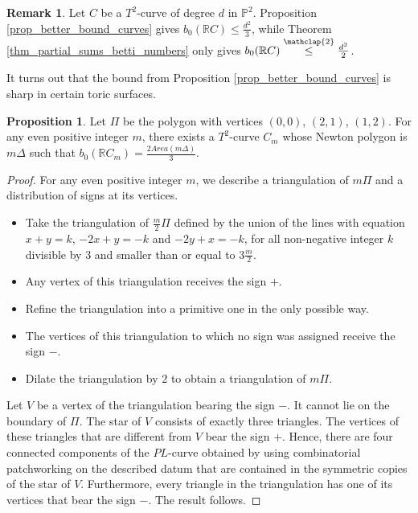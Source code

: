 \documentclass[12pt]{article}
\newcommand\customleqdeux{\stackrel{\mathclap{\normalfont\scriptsize\mbox{2}}}{\leq}}
\newcommand{\R}{\mathbb{R}}
\renewcommand{\P}{\mathbb{P}}
\theoremstyle{definition}
\newtheorem{prop}{Proposition}[section]
\newtheorem{rmk}{Remark}[section]
\begin{document}
\begin{rmk}
    Let $C$ be a $T^2$-curve of degree $d$ in $\P^2$. Proposition \ref{prop_better_bound_curves} gives $b_0(\R C) \leq \frac{d^2}{3}$, while Theorem \ref{thm_partial_sums_betti_numbers} only gives $b_0(\R C) \customleqdeux \frac{d^2}{2}$.
\end{rmk}

\begin{sloppypar}
    It turns out that the bound from Proposition \ref{prop_better_bound_curves} is sharp in certain toric surfaces.
\end{sloppypar}

\begin{prop}
    \label{prop_b0_curves}
    Let $\Pi$ be the polygon with vertices $(0,0)$, $(2,1)$, $(1,2)$.
    For any even positive integer $m$, there exists a $T^2$-curve $C_m$  whose Newton polygon is $m\Delta$ such that $b_0(\R C_m) = \frac{2Area(m\Delta)}{3}$.
\end{prop}

\begin{proof}
    For any even positive integer $m$, we describe a triangulation of $m\Pi$ and a distribution of signs at its vertices.
    \begin{itemize}
        \item Take the triangulation of $\frac{m}{2} \Pi$ defined by the union of the lines with equation $x+y = k$, $-2x+y = -k$ and $-2y+x = -k$, for all non-negative integer $k$ divisible by $3$ and smaller than or equal to $3\frac{m}{2}$.
        \item Any vertex of this triangulation receives the sign $+$.
        \item Refine the triangulation into a primitive one in the only possible way.
        \item The vertices of this triangulation to which no sign was assigned receive the sign $-$.
        \item Dilate the triangulation by $2$ to obtain a triangulation of $m\Pi$.
    \end{itemize}
    Let $V$ be a vertex of the triangulation bearing the sign $-$. It cannot lie on the boundary of $\Pi$. The star of $V$ consists of exactly three triangles. The vertices of these triangles that are different from $V$ bear the sign $+$. Hence, there are four connected components of the $PL$-curve obtained by using combinatorial patchworking on the described datum that are contained in the symmetric copies of the star of $V$. Furthermore, every triangle in the triangulation has one of its vertices that bear the sign $-$. The result follows.
\end{proof}
\end{document}
